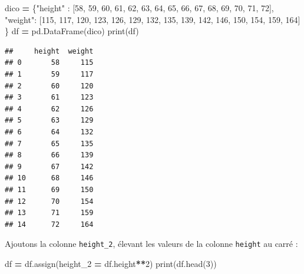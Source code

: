 \documentclass[12pt,]{book}
\newenvironment{Shaded}{\begin{snugshade}}{\end{snugshade}}
\newcommand{\DecValTok}[1]{\textcolor[rgb]{0.00,0.00,0.81}{#1}}
\newcommand{\StringTok}[1]{\textcolor[rgb]{0.31,0.60,0.02}{#1}}
\newcommand{\OperatorTok}[1]{\textcolor[rgb]{0.81,0.36,0.00}{\textbf{#1}}}
\newcommand{\BuiltInTok}[1]{#1}
\newcommand{\NormalTok}[1]{#1}
\numberwithin{equation}{section}
\numberwithin{countremarque}{section}
\begin{document}
\begin{Shaded}
\begin{Highlighting}[]
\NormalTok{dico }\OperatorTok{=}\NormalTok{ \{}\StringTok{"height"}\NormalTok{ : }
\NormalTok{               [}\DecValTok{58}\NormalTok{, }\DecValTok{59}\NormalTok{, }\DecValTok{60}\NormalTok{, }\DecValTok{61}\NormalTok{, }\DecValTok{62}\NormalTok{,}
                \DecValTok{63}\NormalTok{, }\DecValTok{64}\NormalTok{, }\DecValTok{65}\NormalTok{, }\DecValTok{66}\NormalTok{, }\DecValTok{67}\NormalTok{,}
                \DecValTok{68}\NormalTok{, }\DecValTok{69}\NormalTok{, }\DecValTok{70}\NormalTok{, }\DecValTok{71}\NormalTok{, }\DecValTok{72}\NormalTok{],}
        \StringTok{"weight"}\NormalTok{: }
\NormalTok{               [}\DecValTok{115}\NormalTok{, }\DecValTok{117}\NormalTok{, }\DecValTok{120}\NormalTok{, }\DecValTok{123}\NormalTok{, }\DecValTok{126}\NormalTok{,}
                \DecValTok{129}\NormalTok{, }\DecValTok{132}\NormalTok{, }\DecValTok{135}\NormalTok{, }\DecValTok{139}\NormalTok{, }\DecValTok{142}\NormalTok{,}
                \DecValTok{146}\NormalTok{, }\DecValTok{150}\NormalTok{, }\DecValTok{154}\NormalTok{, }\DecValTok{159}\NormalTok{, }\DecValTok{164}\NormalTok{]}
\NormalTok{       \} }
\NormalTok{df }\OperatorTok{=}\NormalTok{ pd.DataFrame(dico)}
\BuiltInTok{print}\NormalTok{(df)}
\end{Highlighting}
\end{Shaded}

\begin{lstlisting}
##     height  weight
## 0       58     115
## 1       59     117
## 2       60     120
## 3       61     123
## 4       62     126
## 5       63     129
## 6       64     132
## 7       65     135
## 8       66     139
## 9       67     142
## 10      68     146
## 11      69     150
## 12      70     154
## 13      71     159
## 14      72     164
\end{lstlisting}

Ajoutons la colonne \texttt{height\_2}, élevant les valeurs de la
colonne \texttt{height} au carré :

\begin{Shaded}
\begin{Highlighting}[]
\NormalTok{df }\OperatorTok{=}\NormalTok{ df.assign(height_2 }\OperatorTok{=}\NormalTok{ df.height}\OperatorTok{**}\DecValTok{2}\NormalTok{)}
\BuiltInTok{print}\NormalTok{(df.head(}\DecValTok{3}\NormalTok{))}
\end{Highlighting}
\end{Shaded}
\end{document}
